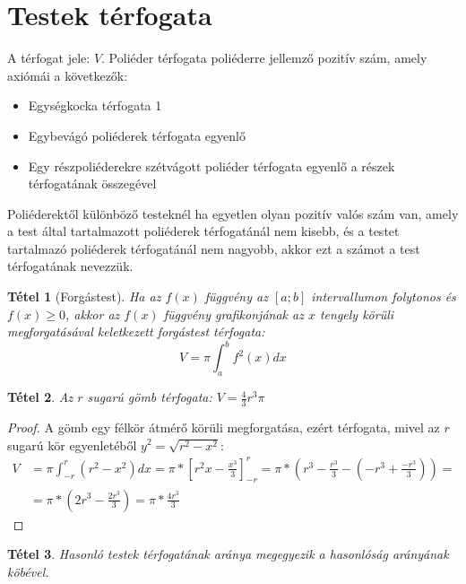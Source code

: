 \documentclass[twoside,12pt]{report}
\newtheorem{theorem}{Tétel}[section]
\theoremstyle{definition}
\begin{document}
\section{Testek térfogata}
	A térfogat jele: $V$. Poliéder térfogata poliéderre jellemző pozitív szám, amely axiómái a következők:
	\begin{itemize}
		\item Egységkocka térfogata 1
		\item Egybevágó poliéderek térfogata egyenlő
		\item Egy részpoliéderekre szétvágott poliéder térfogata egyenlő a részek térfogatának összegével
	\end{itemize}
	Poliéderektől különböző testeknél ha egyetlen olyan pozitív valós szám van, amely a test által tartalmazott poliéderek térfogatánál nem kisebb, és a testet tartalmazó poliéderek térfogatánál nem nagyobb, akkor ezt a számot a test térfogatának nevezzük.
	\begin{theorem}[Forgástest]
		Ha az $f(x)$ függvény az $[a;b]$ intervallumon folytonos és $f(x)\ge0$, akkor az $f(x)$ függvény grafikonjának az $x$ tengely körüli megforgatásával keletkezett forgástest térfogata:
		\begin{equation*}
			V=\pi\int_{a}^{b}f^2(x)dx
		\end{equation*}
	\end{theorem}
	\begin{theorem}
		Az $r$ sugarú gömb térfogata: $V=\frac{4}{3}r^3\pi$
	\end{theorem}
	\begin{proof}
		A gömb egy félkör átmérő körüli megforgatása, ezért térfogata, mivel az $r$ sugarú kör egyenletéből $y^2=\sqrt{r^2-x^2}$:
		\begin{align*}
		V&=\pi\int_{-r}^{r}\left(r^2-x^2\right)dx=\pi*\left[r^2x-\frac{x^3}{3}\right]^r_{-r}=\pi*
		\left(r^3-\frac{r^3}{3}-\left(-r^3+\frac{-r^3}{3}\right)\right)=\\
		&=\pi*\left(2r^3-\frac{2r^3}{3}\right)=\pi*\frac{4r^3}{3}
		\end{align*}
	\end{proof}
	\begin{theorem}
		Hasonló testek térfogatának aránya megegyezik a hasonlóság arányának köbével.
	\end{theorem}
\end{document}
